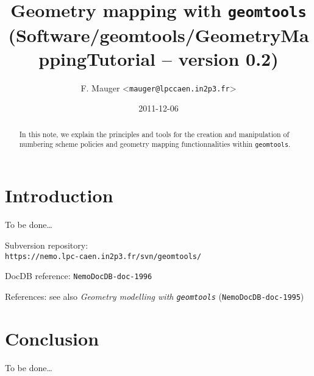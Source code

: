 \documentclass[a4paper,12pt]{article}
\title{Geometry mapping with \texttt{geomtools}\\%
{\small{(Software/geomtools/GeometryMappingTutorial -- version 0.2)}}}
\author{F. Mauger <\texttt{mauger@lpccaen.in2p3.fr}>}
\date{2011-12-06}
\newcommand{\pn}{\par\noindent}
\begin{document}
\maketitle

\begin{abstract}
In this note, we explain the principles and tools
for the creation and manipulation of numbering scheme policies
and geometry mapping functionnalities within \texttt{geomtools}.
\end{abstract}

\tableofcontents

\section{Introduction}

\pn To be done\dots

\vskip 5mm
\pn
Subversion repository:\\
\texttt{https://nemo.lpc-caen.in2p3.fr/svn/geomtools/}
\pn
DocDB reference: \texttt{NemoDocDB-doc-1996}
\pn
References: see also
\textit{Geometry modelling with \texttt{geomtools}} (\texttt{NemoDocDB-doc-1995})
\pagebreak



\pagebreak


\pagebreak


\pagebreak


\pagebreak


\pagebreak
\section{Conclusion}

\pn To be done\dots

\pagebreak
\appendix


\end{document}
